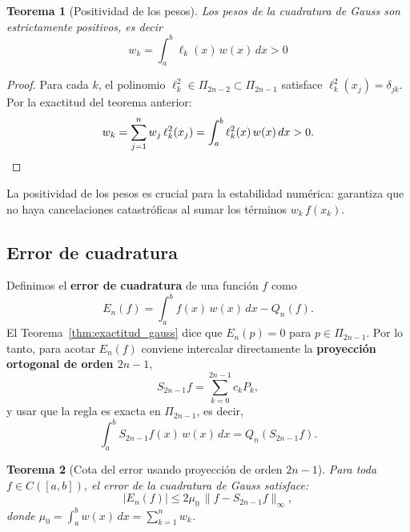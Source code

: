 \documentclass[a4paper,11pt]{report}
\newtheorem{theorem}{Teorema}[chapter]
\begin{document}
\begin{theorem}[Positividad de los pesos]\label{thm:positividad_gauss}
Los pesos de la cuadratura de Gauss son estrictamente positivos, es decir 
\[
w_k = \int_a^b \ell_k(x)\,w(x)\,dx > 0
\]
\end{theorem}

\begin{proof}
Para cada $k$, el polinomio $\ell_k^2 \in \Pi_{2n-2} \subset \Pi_{2n-1}$ satisface $\ell_k^2(x_j) = \delta_{jk}$.  Por la exactitud del teorema anterior:
\[
w_k = \sum_{j=1}^n w_j\,\ell_k^2(x_j) = \int_a^b \ell_k^2(x)\,w(x)\,dx > 0. \qedhere
\]
\end{proof}

La positividad de los pesos es crucial para la estabilidad numérica: garantiza que no haya cancelaciones catastróficas al sumar los términos $w_k\,f(x_k)$.

\subsection{Error de cuadratura}

Definimos el \textbf{error de cuadratura} de una función $f$ como
\[
E_n(f) = \int_a^b f(x)\,w(x)\,dx - Q_n(f).
\]
El Teorema~\ref{thm:exactitud_gauss} dice que $E_n(p) = 0$ para $p \in \Pi_{2n-1}$.  Por lo tanto, para acotar $E_n(f)$ conviene intercalar directamente la \textbf{proyección ortogonal de orden $2n-1$},
\[
S_{2n-1}f = \sum_{k=0}^{2n-1} c_k P_k,
\]
y usar que la regla es exacta en $\Pi_{2n-1}$, es decir,
\[
\int_a^b S_{2n-1}f(x)\,w(x)\,dx = Q_n(S_{2n-1}f).
\]

\begin{theorem}[Cota del error usando proyección de orden $2n{-}1$]\label{thm:error_gauss_proj}
Para toda $f\in C([a,b])$, el error de la cuadratura de Gauss satisface:
\[
|E_n(f)| \leq 2\mu_0\,\|f - S_{2n-1}f\|_{\infty},
\]
donde $\mu_0 = \int_a^b w(x)\,dx = \sum_{k=1}^n w_k$.
\end{theorem}
\end{document}
